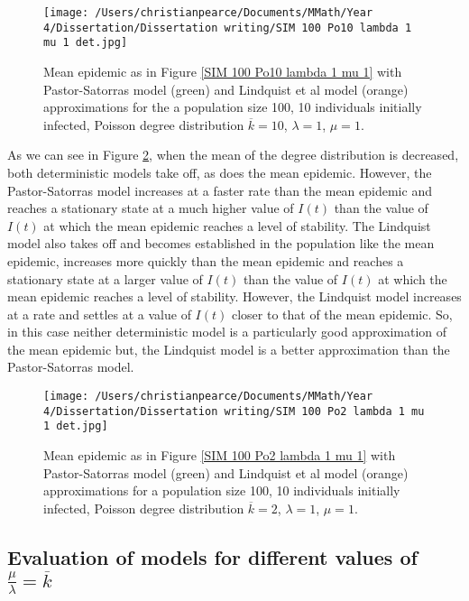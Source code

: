 \documentclass{uonmathsreport}
\begin{document}
\begin{figure}
\begin{center}
\texttt{[image: /Users/christianpearce/Documents/MMath/Year 4/Dissertation/Dissertation writing/SIM 100 Po10 lambda 1 mu 1 det.jpg]}
\end{center}
\caption{Mean epidemic as in Figure \ref{SIM 100 Po10 lambda 1 mu 1} with Pastor-Satorras model (green) and Lindquist et al model (orange) approximations for the a population size 100, 10 individuals initially infected, Poisson degree distribution $\overline{k}=10$, $\lambda=1$, $\mu=1$.}
\label{7.7}
\end{figure}

As we can see in Figure \ref{7.8}, when the mean of the degree distribution is decreased, both deterministic models take off, as does the mean epidemic. However, the Pastor-Satorras model increases at a faster rate than the mean epidemic and reaches a stationary state at a much higher value of $I(t)$ than the value of $I(t)$ at which the mean epidemic reaches a level of stability. The Lindquist model also takes off and becomes established in the population like the mean epidemic, increases more quickly than the mean epidemic and reaches a stationary state at a larger value of $I(t)$ than the value of $I(t)$ at which the mean epidemic reaches a level of stability. However, the Lindquist model increases at a rate and settles at a value of $I(t)$ closer to that of the mean epidemic. So, in this case neither deterministic model is a particularly good approximation of the mean epidemic but, the Lindquist model is a better approximation than the Pastor-Satorras model.

\begin{figure}
\begin{center}
\texttt{[image: /Users/christianpearce/Documents/MMath/Year 4/Dissertation/Dissertation writing/SIM 100 Po2 lambda 1 mu 1 det.jpg]}
\end{center}
\caption{Mean epidemic as in Figure \ref{SIM 100 Po2 lambda 1 mu 1} with Pastor-Satorras model (green) and Lindquist et al model (orange) approximations for a population size 100, 10 individuals initially infected, Poisson degree distribution $\overline{k}=2$, $\lambda=1$, $\mu=1$.}
\label{7.8}
\end{figure}

\subsection{Evaluation of models for different values of $\frac{\mu}{\lambda}=\overline{k}$} \label{subsec:7.4}
\end{document}
